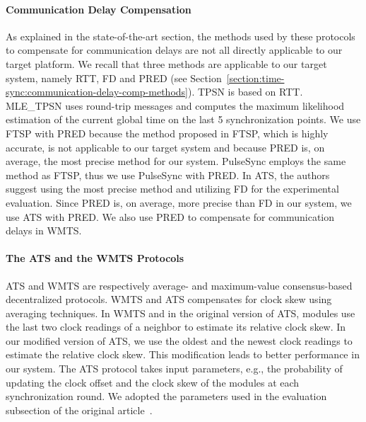\paragraph{Communication Delay Compensation} As explained in the state-of-the-art section, the methods used by these protocols to compensate for communication delays are not all directly applicable to our target platform. We recall that three methods are applicable to our target system, namely RTT, FD and PRED (see Section~\ref{section:time-sync:communication-delay-comp-methods}). TPSN is based on RTT. MLE\_TPSN uses round-trip messages and computes the maximum likelihood estimation of the current global time on the last 5 synchronization points.  We use FTSP with PRED because the method proposed in FTSP, which is highly accurate, is not applicable to our target system and because PRED is, on average, the most precise method for our system. PulseSync employs the same method as FTSP, thus we use PulseSync with PRED. In ATS, the authors suggest using the most precise method and utilizing FD for the experimental evaluation. Since PRED is, on average, more precise than FD in our system, we use ATS with PRED. We also use PRED to compensate for communication delays in WMTS.

\paragraph{The ATS and the WMTS Protocols}
ATS and WMTS are respectively average- and maximum-value consensus-based decentralized protocols. WMTS and ATS compensates for clock skew using averaging techniques. In WMTS and in the original version of ATS, modules use the last two clock readings of a neighbor to estimate its relative clock skew. In our modified version of ATS, we use the oldest and the newest clock readings to estimate the relative clock skew. This modification leads to better performance in our system. The ATS protocol takes input parameters, e.g., the probability of updating the clock offset and the clock skew of the modules at each synchronization round. We adopted the parameters used in the evaluation subsection of the original article~\cite{schenato2011average}.

